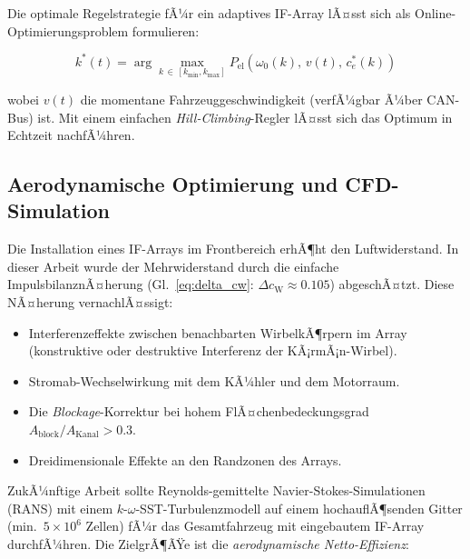 ﻿\documentclass[12pt, a4paper]{report}
\theoremstyle{definition}
\theoremstyle{remark}
\newcommand{\cW}{c_{\text{W}}}
\begin{document}
Die optimale Regelstrategie fÃ¼r ein adaptives IF-Array lÃ¤sst sich als
Online-Optimie\-rungsproblem formulieren:

\begin{equation}
  k^*(t) = \arg\max_{k\,\in\,[k_{\min},k_{\max}]}
  P_{\text{el}}\!\left(\omega_0(k),\, v(t),\, c_e^*(k)\right)
  \label{eq:k_opt_online}
\end{equation}

wobei $v(t)$ die momentane Fahrzeuggeschwindigkeit (verfÃ¼gbar Ã¼ber CAN-Bus) ist.
Mit einem einfachen \emph{Hill-Climbing}-Regler lÃ¤sst sich das Optimum
in Echtzeit nachfÃ¼hren.

\subsection{Aerodynamische Optimierung und CFD-Simulation}
\label{ssec:ausblick_cfd}

Die Installation eines IF-Arrays im Frontbereich erhÃ¶ht den Luftwiderstand.
In dieser Arbeit wurde der Mehrwiderstand durch die einfache ImpulsbilanznÃ¤herung
(Gl.~\eqref{eq:delta_cw}: $\Delta\cW \approx 0.105$) abgeschÃ¤tzt. Diese
NÃ¤herung vernachlÃ¤ssigt:

\begin{itemize}
  \item Interferenzeffekte zwischen benachbarten WirbelkÃ¶rpern im Array
        (konstruktive oder destruktive Interferenz der KÃ¡rmÃ¡n-Wirbel).
  \item Stromab-Wechselwirkung mit dem KÃ¼hler und dem Motorraum.
  \item Die \emph{Blockage}-Korrektur bei hohem FlÃ¤chenbedeckungsgrad
        $A_{\text{block}}/A_{\text{Kanal}} > 0.3$.
  \item Dreidimensionale Effekte an den Randzonen des Arrays.
\end{itemize}

ZukÃ¼nftige Arbeit sollte Reynolds-gemittelte Navier-Stokes-Simulationen (RANS)
mit einem $k$-$\omega$-SST-Turbulenzmodell auf einem hochauflÃ¶senden Gitter
(min.\ $5 \times 10^6$ Zellen) fÃ¼r das Gesamtfahrzeug mit eingebautem IF-Array
durchfÃ¼hren. Die ZielgrÃ¶ÃŸe ist die \emph{aerodynamische Netto-Effizienz}:
\end{document}
